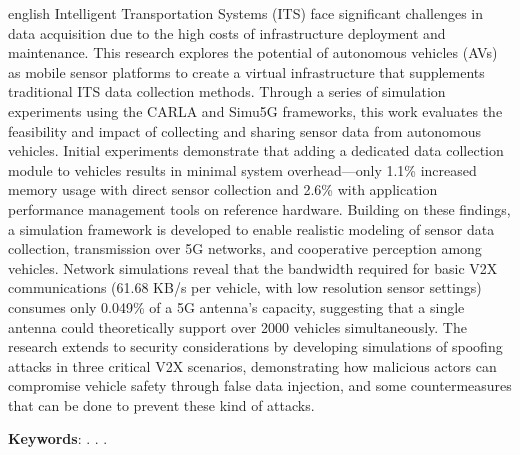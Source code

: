 \documentclass[
	12pt,				%
	openright,			%
	oneside,			%
	a4paper,			%
	english,			%
	brazil				%
	]{unbtex}
\begin{document}
{\begin{resumo}[Abstract]
\begin{otherlanguage*}{english}
Intelligent Transportation Systems (ITS) face significant challenges in data acquisition due to the high costs of infrastructure deployment and maintenance. This research explores the potential of autonomous vehicles (AVs) as mobile sensor platforms to create a virtual infrastructure that supplements traditional ITS data collection methods. Through a series of simulation experiments using the CARLA and Simu5G frameworks, this work evaluates the feasibility and impact of collecting and sharing sensor data from autonomous vehicles. Initial experiments demonstrate that adding a dedicated data collection module to vehicles results in minimal system overhead—only 1.1\% increased memory usage with direct sensor collection and 2.6\% with application performance management tools on reference hardware. Building on these findings, a simulation framework is developed to enable realistic modeling of sensor data collection, transmission over 5G networks, and cooperative perception among vehicles. Network simulations reveal that the bandwidth required for basic V2X communications (61.68 KB/s per vehicle, with low resolution sensor settings) consumes only 0.049\% of a 5G antenna's capacity, suggesting that a single antenna could theoretically support over 2000 vehicles simultaneously. The research extends to security considerations by developing simulations of spoofing attacks in three critical V2X scenarios, demonstrating how malicious actors can compromise vehicle safety through false data injection, and some countermeasures that can be done to prevent these kind of attacks. 
\vspace{\onelineskip}
 
\noindent 
\textbf{Keywords}: \kwordinome. \kwordiinome. \kwordiiinome. 
\end{otherlanguage*}
\end{resumo}}


\listoffigures*
\cleardoublepage

\listoftables*
\cleardoublepage

{\SingleSpacing
\printnomenclature[2cm]}
\cleardoublepage
\end{document}
